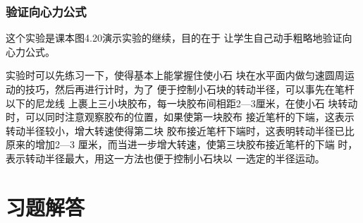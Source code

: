 \subsubsection{验证向心力公式}
这个实验是课本图4.20演示实验的继续，目的在于
让学生自己动手粗略地验证向心力公式。

实验时可以先练习一下，使得基本上能掌握住使小石
块在水平面内做匀速圆周运动的技巧，然后再进行计时，为了
便于控制小石块的转动半径，可以事先在笔杆以下的尼龙线
上裹上三小块胶布，每一块胶布间相距2—3厘米，在使小石
块转动时，可以同时注意观察胶布的位置，如果使第一块胶布
接近笔杆的下端，这表示转动半径较小，增大转速使得第二块
胶布接近笔杆下端时，这表明转动半径已比原来的增加2—3
厘米，而当进一步增大转速，使第三块胶布接近笔杆的下端
时，表示转动半径最大，用这一方法也便于控制小石块以
一选定的半径运动。

\section{习题解答}


